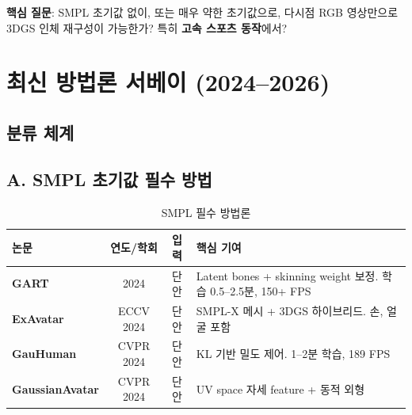 \documentclass[11pt, a4paper]{report}
\begin{document}
\begin{gapbox}
\textbf{핵심 질문}: SMPL 초기값 없이, 또는 매우 약한 초기값으로,
다시점 RGB 영상만으로 3DGS 인체 재구성이 가능한가?
특히 \textbf{고속 스포츠 동작}에서?
\end{gapbox}


\chapter{최신 방법론 서베이 (2024--2026)}

\section{분류 체계}

\begin{figure}[H]
\centering
{}
\end{figure}


\section{A. SMPL 초기값 필수 방법}

\begin{table}[H]
\centering
\caption{SMPL 필수 방법론}
\renewcommand{\arraystretch}{1.2}
\scriptsize
\begin{tabularx}{\textwidth}{lccX}
\toprule
\textbf{논문} & \textbf{연도/학회} & \textbf{입력} & \textbf{핵심 기여} \\
\midrule
\textbf{GART} & 2024 & 단안 & Latent bones + skinning weight 보정. 학습 0.5--2.5분, 150+ FPS \\
\textbf{ExAvatar} & ECCV 2024 & 단안 & SMPL-X 메시 + 3DGS 하이브리드. 손, 얼굴 포함 \\
\textbf{GauHuman} & CVPR 2024 & 단안 & KL 기반 밀도 제어. 1--2분 학습, 189 FPS \\
\textbf{GaussianAvatar} & CVPR 2024 & 단안 & UV space 자세 feature + 동적 외형 \\
\bottomrule
\end{tabularx}
\end{table}
\end{document}
